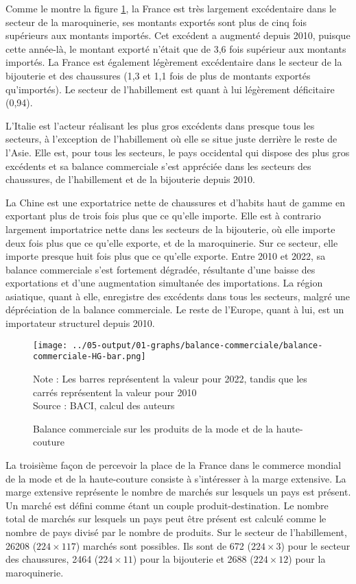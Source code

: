 \documentclass[french,10pt,a4paper]{article}
\begin{document}
Comme le montre la figure \ref{fig:balance-commerciale}, la France est très largement excédentaire dans le secteur de la maroquinerie, ses montants exportés sont plus de cinq fois supérieurs aux montants importés. Cet excédent a augmenté depuis 2010, puisque cette année-là, le montant exporté n'était que de 3,6 fois supérieur aux montants importés. La France est également légèrement excédentaire dans le secteur de la bijouterie et des chaussures (1,3 et 1,1 fois de plus de montants exportés qu'importés). Le secteur de l'habillement est quant à lui légèrement déficitaire (0,94).

L'Italie est l'acteur réalisant les plus gros excédents dans presque tous les secteurs, à l'exception de l'habillement où elle se situe juste derrière le reste de l'Asie. Elle est, pour tous les secteurs, le pays occidental qui dispose des plus gros excédents et sa balance commerciale s'est appréciée dans les secteurs des chaussures, de l'habillement et de la bijouterie depuis 2010.

La Chine est une exportatrice nette de chaussures et d'habits haut de gamme en exportant plus de trois fois plus que ce qu'elle importe. Elle est à contrario largement importatrice nette dans les secteurs de la bijouterie, où elle importe deux fois plus que ce qu'elle exporte, et de la maroquinerie. Sur ce secteur, elle importe presque huit fois plus que ce qu'elle exporte. Entre 2010 et 2022, sa balance commerciale s'est fortement dégradée, résultante d'une baisse des exportations et d'une augmentation simultanée des importations. La région asiatique, quant à elle, enregistre des excédents dans tous les secteurs, malgré une dépréciation de la balance commerciale. Le reste de l'Europe, quant à lui, est un importateur structurel depuis 2010. 

\begin{figure}[!h]
  \centering
  \texttt{[image: ../05-output/01-graphs/balance-commerciale/balance-commerciale-HG-bar.png]}
  \captionsetup{justification=justified, singlelinecheck=false, font=small}
  \caption*{Note : Les barres représentent la valeur pour 2022, tandis que les carrés représentent la valeur pour 2010 \\
  Source : BACI, calcul des auteurs}
  \captionsetup{justification=centering, singlelinecheck=true, font=normalsize}
  \caption{Balance commerciale sur les produits de la mode et de la haute-couture}
  \label{fig:balance-commerciale}
\end{figure}


La troisième façon de percevoir la place de la France dans le commerce mondial de la mode et de la haute-couture consiste à s'intéresser à la marge extensive. La marge extensive représente le nombre de marchés sur lesquels un pays est présent. Un marché est défini comme étant un couple produit-destination. Le nombre total de marchés sur lesquels un pays peut être présent est calculé comme le nombre de pays divisé par le nombre de produits. Sur le secteur de l'habillement, 26208 ($224 \times 117$) marchés sont possibles. Ils sont de 672 ($224 \times 3$) pour le secteur des chaussures, 2464 ($224 \times 11$) pour la bijouterie et 2688 ($224 \times 12$) pour la maroquinerie.
\end{document}
